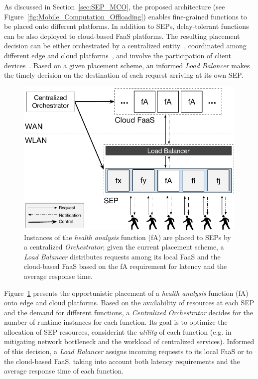 As discussed in Section~\ref{sec:SEP_MCO}, the proposed architecture (see Figure~\ref{fig:Mobile_Computation_Offloading}) enables fine-grained functions to be placed onto different platforms. In addition to SEPs, delay-tolerant functions can be also deployed to cloud-based FaaS platforms. The resulting placement decision can be either orchestrated by a centralized entity~\cite{Taleb:2013}, coordinated among different edge and cloud platforms~\cite{Mach:2017}, and involve the participation of client devices~\cite{Baresi:2018}. Based on a given placement scheme, an informed \textit{Load Balancer} makes the timely decision on the destination of each request arriving at its own SEP.


\begin{figure}[tbp]
	\centering
	\includegraphics[width=\linewidth]{Figs/Edge_Data_Analytics_Personal_Assistant.pdf}
	\caption{Instances of the \textit{health analysis} function (fA) are placed to SEPs by a centralized \textit{Orchestrator}; given the current placement scheme, a \textit{Load Balancer} distributes requests among its local FaaS and the cloud-based FaaS based on the fA requirement for latency and the average response time.}
	\label{fig:Edge_Data_Analytics_Personal_Assistant}
\end{figure}

Figure~\ref{fig:Edge_Data_Analytics_Personal_Assistant} presents the opportunistic placement of a \textit{health analysis} function (fA) onto edge and cloud platforms. Based on the availability of resources at each SEP and the demand for different functions, a \textit{Centralized Orchestrator} decides for the number of runtime instances for each function. Its goal is to optimize the allocation of SEP resources, considerint the \textit{utility} of each function (e.g. in mitigating network bottleneck and the workload of centralized services). Informed of this decision, a \textit{Load Balancer} assigns incoming requests to its local FaaS or to the cloud-based FaaS, taking into account both latency requirements and the average response time of each function. 

